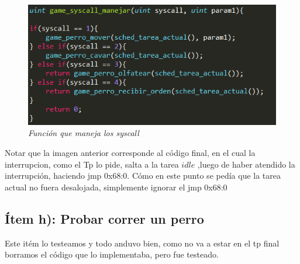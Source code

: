 \begin{figure}[H]
\begin{center}
\includegraphics[width=\linewidth]{ejercicio6/syscall_manejar.png}
\caption{{\small \textit{Función que maneja los syscall}}}
\endminipage
\end{center}
\end{figure}

Notar que la imagen anterior corresponde al código final, en el cual la interrupcion, como el Tp lo pide, salta a la tarea $idle$ ,luego de haber atendido la interrupción, haciendo jmp 0x68:0. Cómo en este punto se pedía que la tarea actual no fuera desalojada, simplemente ignorar el jmp 0x68:0 

\subsection{Ítem h): Probar correr un perro}

Este itém lo testeamos y todo anduvo bien, como no va a estar en el tp final borramos el código que lo implementaba, pero fue testeado.


